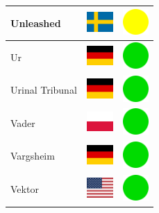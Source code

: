 \documentclass[12pt, a4paper, twoside]{report}
\begin{document}
\begin{center}
\begin{longtable}{|p{5cm}|p{2cm}|p{2cm}|}
 Unleashed                                                  & \includegraphics[width=1cm]{4x3/se} &   \includegraphics[width=1cm]{likes/m} \\ \hline
 Ur                                                         & \includegraphics[width=1cm]{4x3/de} &   \includegraphics[width=1cm]{likes/y} \\ \hline
 Urinal Tribunal                                            & \includegraphics[width=1cm]{4x3/de} &   \includegraphics[width=1cm]{likes/y} \\ \hline
 Vader                                                      & \includegraphics[width=1cm]{4x3/pl} &   \includegraphics[width=1cm]{likes/y} \\ \hline
 Vargsheim                                                  & \includegraphics[width=1cm]{4x3/de} &   \includegraphics[width=1cm]{likes/y} \\ \hline
 Vektor                                                     & \includegraphics[width=1cm]{4x3/us} &   \includegraphics[width=1cm]{likes/y} \\ \hline

\end{longtable}
\end{center}
\end{document}
